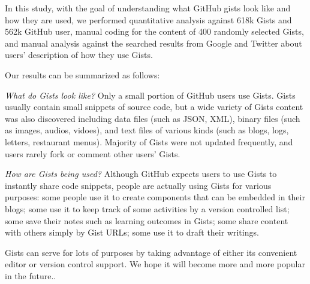In this study, with the goal of understanding what GitHub gists look like and how they are used, we performed quantitative analysis against 618k Gists and 562k GitHub user, manual coding for the content of 400 randomly selected Gists, and manual analysis against the searched results from Google and Twitter about users' description of how they use Gists. 

Our results can be summarized as follows:

\textsl{What do Gists look like?} Only a small portion of GitHub users use Gists. Gists usually contain small snippets of source code, but a wide variety of Gists content was also discovered including data files (such as JSON, XML), binary files (such as images, audios, vidoes), and text files of various kinds (such as blogs, logs, letters, restaurant menus). Majority of Gists were not updated frequently, and users rarely fork or comment other users' Gists.

\textsl{How are Gists being used?} Although GitHub expects users to use Gists to instantly share code snippets, people are actually using Gists for various purposes: some people use it to create components that can be embedded in their blogs; some use it to keep track of some activities by a version controlled list; some save their notes such as learning outcomes in Gists; some share content with others simply by Gist URLs; some use it to draft their writings.

Gists can serve for lots of purposes by taking advantage of either its convenient editor or version control support. We hope it will become more and more popular in the future..